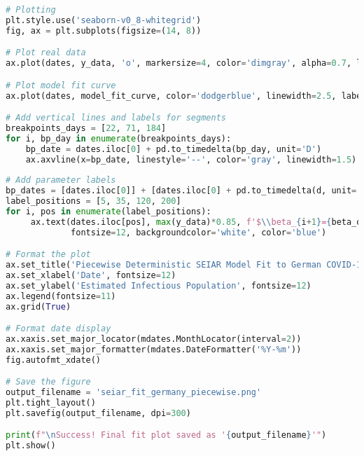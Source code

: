 \begin{lstlisting}[language=Python, caption={Python script for fitting a four-stage piecewise deterministic SEIAR model, aligning with the Bayesian model's structure.}]
# Plotting
plt.style.use('seaborn-v0_8-whitegrid')
fig, ax = plt.subplots(figsize=(14, 8))

# Plot real data
ax.plot(dates, y_data, 'o', markersize=4, color='dimgray', alpha=0.7, label='Observed Infectious Pool')

# Plot model fit curve
ax.plot(dates, model_fit_curve, color='dodgerblue', linewidth=2.5, label='Piecewise SEIAR Model Fit')

# Add vertical lines and labels for segments
breakpoints_days = [22, 71, 184]
for i, bp_day in enumerate(breakpoints_days):
    bp_date = dates.iloc[0] + pd.to_timedelta(bp_day, unit='D')
    ax.axvline(x=bp_date, linestyle='--', color='gray', linewidth=1.5)
    
# Add parameter labels
bp_dates = [dates.iloc[0]] + [dates.iloc[0] + pd.to_timedelta(d, unit='D') for d in breakpoints_days]
label_positions = [5, 35, 120, 200]
for i, pos in enumerate(label_positions):
     ax.text(dates.iloc[pos], max(y_data)*0.85, f'$\\beta_{i+1}={beta_opt[i]:.3f}$', 
             fontsize=12, backgroundcolor='white', color='blue')

# Format the plot
ax.set_title('Piecewise Deterministic SEIAR Model Fit to German COVID-19 Data', fontsize=16, pad=20)
ax.set_xlabel('Date', fontsize=12)
ax.set_ylabel('Estimated Infectious Population', fontsize=12)
ax.legend(fontsize=11)
ax.grid(True)

# Format date display
ax.xaxis.set_major_locator(mdates.MonthLocator(interval=2))
ax.xaxis.set_major_formatter(mdates.DateFormatter('%Y-%m'))
fig.autofmt_xdate()

# Save the figure
output_filename = 'seiar_fit_germany_piecewise.png'
plt.tight_layout()
plt.savefig(output_filename, dpi=300)

print(f"\nSuccess! Final fit plot saved as '{output_filename}'")
plt.show() 
\end{lstlisting} 